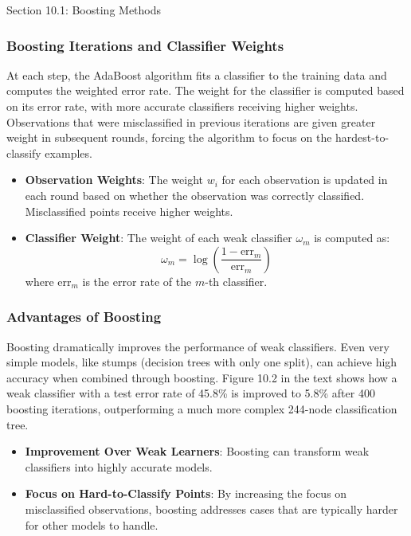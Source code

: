 \begin{notes}{Section 10.1: Boosting Methods}
    \subsubsection*{Boosting Iterations and Classifier Weights}
    
    At each step, the AdaBoost algorithm fits a classifier to the training data and computes the weighted error rate. The weight for the classifier is computed based on its error rate, with more 
    accurate classifiers receiving higher weights. Observations that were misclassified in previous iterations are given greater weight in subsequent rounds, forcing the algorithm to focus on the 
    hardest-to-classify examples.
    
    \begin{highlight}
        \begin{itemize}
            \item \textbf{Observation Weights}: The weight \(w_i\) for each observation is updated in each round based on whether the observation was correctly classified. Misclassified points receive higher weights.
            \item \textbf{Classifier Weight}: The weight of each weak classifier $\omega_m$ is computed as:
            \[
            \omega_m = \log \left( \frac{1 - \text{err}_m}{\text{err}_m} \right)
            \]
            where \(\text{err}_m\) is the error rate of the \(m\)-th classifier.
        \end{itemize}
    \end{highlight}
    
    \subsubsection*{Advantages of Boosting}
    
    Boosting dramatically improves the performance of weak classifiers. Even very simple models, like stumps (decision trees with only one split), can achieve high accuracy when combined through 
    boosting. Figure 10.2 in the text shows how a weak classifier with a test error rate of 45.8\% is improved to 5.8\% after 400 boosting iterations, outperforming a much more complex 244-node classification tree.
    
    \begin{highlight}
        \begin{itemize}
            \item \textbf{Improvement Over Weak Learners}: Boosting can transform weak classifiers into highly accurate models.
            \item \textbf{Focus on Hard-to-Classify Points}: By increasing the focus on misclassified observations, boosting addresses cases that are typically harder for other models to handle.
        \end{itemize}
    \end{highlight}
    

\end{notes}
